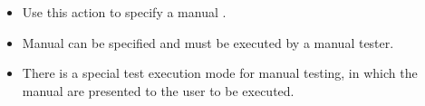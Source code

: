
\begin{itemize}
\item Use this action to specify a manual \gdstep{}.
\item Manual \gdsteps{} can be specified and must be executed by a manual tester.
\item There is a special test execution mode for manual testing, in which the manual \gdsteps{} are presented to the user to be executed.
\end{itemize}
